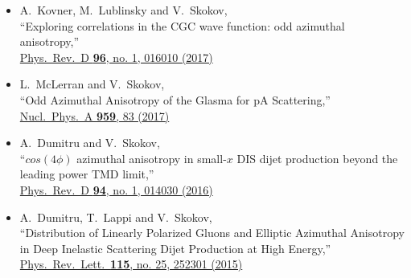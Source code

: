 \begin{itemize}
  \item[]
	   A.~Kovner, M.~Lublinsky and V.~Skokov,\\
  ``Exploring correlations in the CGC wave function: odd azimuthal anisotropy,''\\
   \href{http://dx.doi.org/doi:10.1103/PhysRevD.96.016010}{
  Phys.\ Rev.\ D {\bf 96}, no. 1, 016010 (2017)
}

  \item[]
	    L.~McLerran and V.~Skokov,\\
  ``Odd Azimuthal Anisotropy of the Glasma for pA Scattering,''\\
   \href{http://dx.doi.org/doi:10.1016/j.nuclphysa.2016.12.011}{
Nucl.\ Phys.\ A {\bf 959}, 83 (2017)
}
  \item[]
	    A.~Dumitru and V.~Skokov,\\
  ``$cos(4 \phi )$ azimuthal anisotropy in small-$x$ DIS dijet production beyond the leading power TMD limit,''\\
   \href{http://dx.doi.org/doi:10.1103/PhysRevD.94.014030}{
  Phys.\ Rev.\ D {\bf 94}, no. 1, 014030 (2016)
}

	\item[]
    A.~Dumitru, T.~Lappi and V.~Skokov,\\
  ``Distribution of Linearly Polarized Gluons and Elliptic Azimuthal Anisotropy in Deep Inelastic Scattering Dijet Production at High Energy,''\\
  \href{http://dx.doi.org/doi:10.1103/PhysRevLett.115.252301}{
  Phys.\ Rev.\ Lett.\  {\bf 115}, no. 25, 252301 (2015)
  }
\end{itemize}




